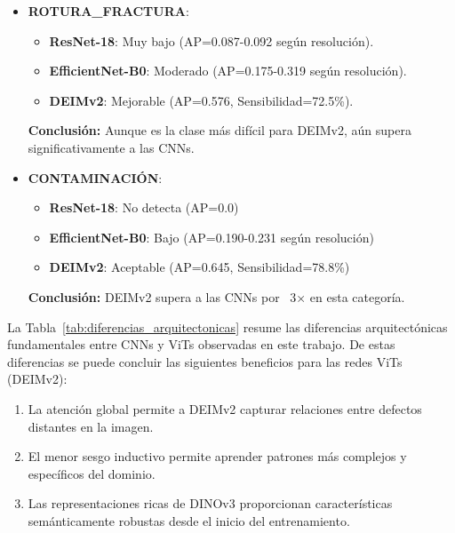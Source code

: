 \begin{itemize}
    \item \textbf{\mbox{ROTURA\_FRACTURA}}: 
    \begin{itemize}
        \item \textbf{ResNet-18}: Muy bajo (AP=0.087-0.092 según resolución).
        \item \textbf{EfficientNet-B0}: Moderado (AP=0.175-0.319 según resolución).
        \item \textbf{DEIMv2}: Mejorable (AP=0.576, Sensibilidad=72.5\%).
    \end{itemize}
    \textbf{Conclusión:} Aunque es la clase más difícil para DEIMv2, aún supera significativamente a las CNNs.
    
    \item \textbf{CONTAMINACIÓN}:
    \begin{itemize}
        \item \textbf{ResNet-18}: No detecta (AP=0.0)
        \item \textbf{EfficientNet-B0}: Bajo (AP=0.190-0.231 según resolución)
        \item \textbf{DEIMv2}: Aceptable (AP=0.645, Sensibilidad=78.8\%)
    \end{itemize}    
    \textbf{Conclusión:} DEIMv2 supera a las CNNs por ~3× en esta categoría.
\end{itemize}

La Tabla~\ref{tab:diferencias_arquitectonicas} resume las diferencias arquitectónicas fundamentales entre CNNs y ViTs observadas en este trabajo. De estas diferencias se puede concluir las siguientes beneficios para las redes ViTs (DEIMv2):
\begin{enumerate}
    \item La atención global permite a DEIMv2 capturar relaciones entre defectos distantes en la imagen.
    \item El menor sesgo inductivo permite aprender patrones más complejos y específicos del dominio.
    \item Las representaciones ricas de DINOv3 proporcionan características semánticamente robustas desde el inicio del entrenamiento.
\end{enumerate}

